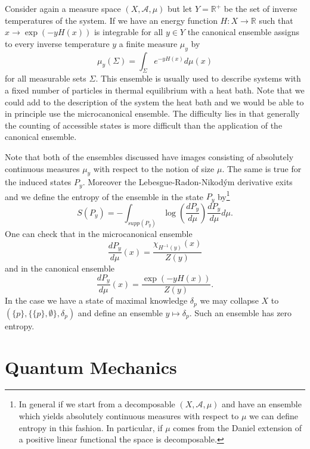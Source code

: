 \begin{example}
Consider again a measure space $(X,\mathcal{A},\mu)$ but let $Y=\mathbb{R}^+$ be the set of inverse temperatures of the system. If we have an energy function $H:X\rightarrow \mathbb{R}$ such that $x\rightarrow \exp(-y H(x))$ is integrable for all $y \in Y$ the canonical ensemble assigns to every inverse temperature $y$ a finite measure $\mu_y$ by
\begin{equation}
\mu_y(\Sigma)=\int_\Sigma e^{-y H(x)}d\mu(x)
\end{equation}
for all measurable sets $\Sigma$. This ensemble is usually used to describe systems with a fixed number of particles in thermal equilibrium with a heat bath. Note that we could add to the description of the system the heat bath and we would be able to in principle use the microcanonical ensemble. The difficulty lies in that generally the counting of accessible states is more difficult than the application of the canonical ensemble.
\end{example}

Note that both of the ensembles discussed have images consisting of absolutely continuous measures $\mu_y$ with respect to the notion of size $\mu$. The same is true for the induced states $P_y$. Moreover the Lebesgue-Radon-Nikodým derivative exits and we define the entropy of the ensemble in the state $P_y$ by\footnote{In general if we start from a decomposable $(X,\mathcal{A},\mu)$ and have an ensemble which yields absolutely continuous measures with respect to $\mu$ we can define entropy in this fashion. In particular, if $\mu$ comes from the Daniel extension of a positive linear functional the space is decomposable.}
\begin{equation}
S(P_y)=-\int_{supp(P_y)} \log\left(\frac{dP_y}{d\mu}\right)\frac{dP_y}{d\mu}d\mu.
\end{equation}
One can check that in the microcanonical ensemble 
\begin{equation}
\frac{dP_y}{d\mu}(x)=\frac{\chi_{H^{-1}(y)}(x)}{Z(y)}
\end{equation}
and in the canonical ensemble 
\begin{equation}
\frac{dP_y}{d\mu}(x)=\frac{\exp(-yH(x))}{Z(y)}. 
\end{equation}
In the case we have a state of maximal knowledge $\delta_p$ we may collapse $X$ to $(\{p\},\{\{p\},\emptyset\},\delta_p)$ and define an ensemble $y\mapsto \delta_p$. Such an ensemble has zero entropy.

\section{Quantum Mechanics}\label{sec:QM}

